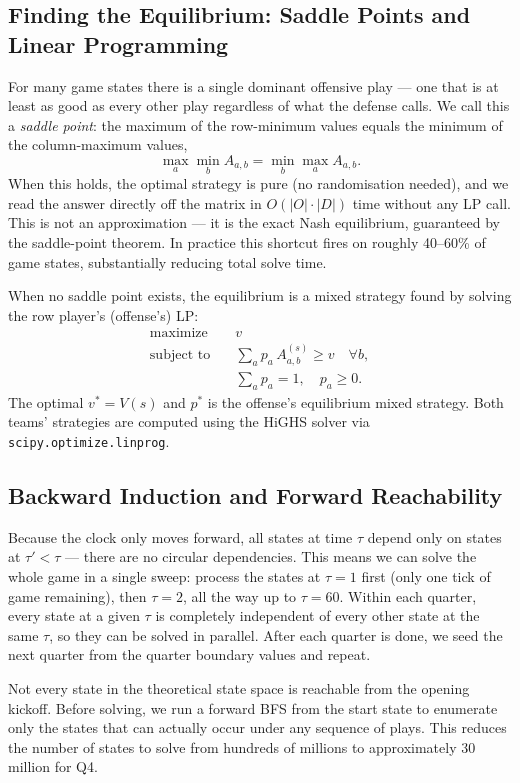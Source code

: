 \documentclass[11pt,letterpaper]{article}
\begin{document}
\subsection{Finding the Equilibrium: Saddle Points and Linear Programming}

For many game states there is a single dominant offensive play --- one that is at
least as good as every other play regardless of what the defense calls.  We call this
a \emph{saddle point}: the maximum of the row-minimum values equals the minimum of
the column-maximum values,
\[
  \max_a \min_b A_{a,b} = \min_b \max_a A_{a,b}.
\]
When this holds, the optimal strategy is pure (no randomisation needed), and we read
the answer directly off the matrix in $O(|O|\cdot|D|)$ time without any LP call.
This is not an approximation --- it is the exact Nash equilibrium, guaranteed by the
saddle-point theorem.  In practice this shortcut fires on roughly 40--60\% of game
states, substantially reducing total solve time.

When no saddle point exists, the equilibrium is a mixed strategy found by solving the
row player's (offense's) LP:
\begin{align*}
  \text{maximize} \quad & v \\
  \text{subject to} \quad
  & \sum_{a} p_a\, A^{(s)}_{a,b} \geq v \quad \forall b, \\
  & \textstyle\sum_{a} p_a = 1, \quad p_a \geq 0.
\end{align*}
The optimal $v^* = V(s)$ and $p^*$ is the offense's equilibrium mixed strategy.
Both teams' strategies are computed using the HiGHS solver via
\texttt{scipy.optimize.linprog}.

\subsection{Backward Induction and Forward Reachability}

Because the clock only moves forward, all states at time $\tau$ depend only on
states at $\tau' < \tau$ --- there are no circular dependencies.  This means we can
solve the whole game in a single sweep: process the states at $\tau=1$ first (only
one tick of game remaining), then $\tau=2$, all the way up to $\tau=60$.  Within
each quarter, every state at a given $\tau$ is completely independent of every other
state at the same $\tau$, so they can be solved in parallel.  After each quarter is
done, we seed the next quarter from the quarter boundary values and repeat.

Not every state in the theoretical state space is reachable from the opening kickoff.
Before solving, we run a forward BFS from the start state to enumerate only the states
that can actually occur under any sequence of plays.  This reduces the number of states
to solve from hundreds of millions to approximately $30$ million for Q4.
\end{document}
